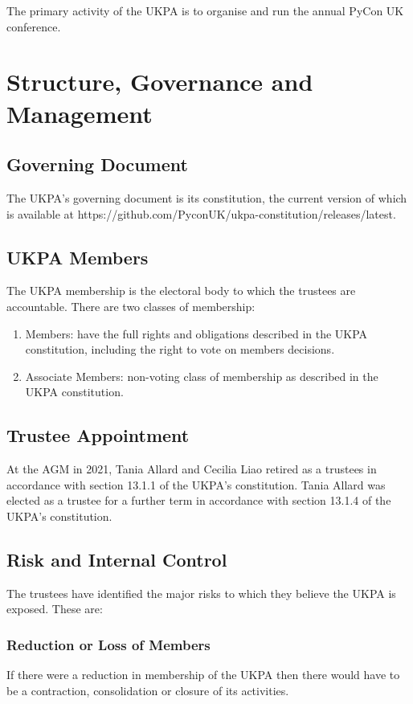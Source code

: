 \documentclass[11pt, final]{article}
\begin{document}
    The primary activity of the UKPA is to organise and run the annual PyCon UK conference.

    \section{Structure, Governance and Management}

        \subsection{Governing Document}
        The UKPA's governing document is its constitution, the current version of which is available at https://github.com/PyconUK/ukpa-constitution/releases/latest.

        \subsection{UKPA Members}
        The UKPA membership is the electoral body to which the trustees are accountable.
		There are two classes of membership:

		\begin{enumerate}
			\item Members: have the full rights and obligations described in the UKPA constitution, including the right to vote on members decisions.
			\item Associate Members: non-voting class of membership as described in the UKPA constitution.
		\end{enumerate}

        \subsection{Trustee Appointment}
		At the AGM in 2021, Tania Allard and Cecilia Liao retired as a trustees in accordance with section 13.1.1 of the UKPA's constitution.
		Tania Allard was elected as a trustee for a further term in accordance with section 13.1.4 of the UKPA's constitution.

	    \subsection{Risk and Internal Control}
        The trustees have identified the major risks to which they believe the UKPA is exposed. These are:

          \subsubsection{Reduction or Loss of Members}
            If there were a reduction in membership of the UKPA then there would have to be a contraction, consolidation or closure of its activities.
\end{document}
